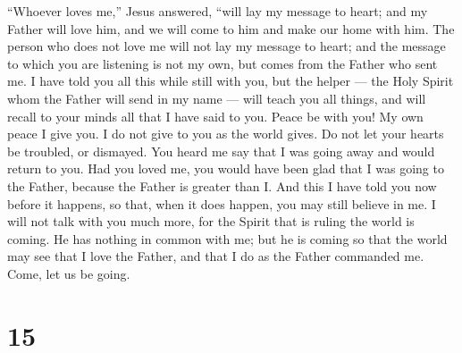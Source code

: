  ``Whoever loves me,'' Jesus answered, ``will lay my
message to heart; and my Father will love him, and we will come to him
and make our home with him.  The person who does not love
me will not lay my message to heart; and the message to which you are
listening is not my own, but comes from the Father who sent me.
 I have told you all this while still with you,
 but the helper --- the Holy Spirit whom the Father will
send in my name --- will teach you all things, and will recall to your
minds all that I have said to you.  Peace be with you! My
own peace I give you. I do not give to you as the world gives. Do not
let your hearts be troubled, or dismayed.  You heard me say
that I was going away and would return to you. Had you loved me, you
would have been glad that I was going to the Father, because the Father
is greater than I.  And this I have told you now before it
happens, so that, when it does happen, you may still believe in me.
 I will not talk with you much more, for the Spirit that is
ruling the world is coming. He has nothing in common with me;
 but he is coming so that the world may see that I love the
Father, and that I do as the Father commanded me. Come, let us be going.

\hypertarget{section-14}{%
\section{15}\label{section-14}}

